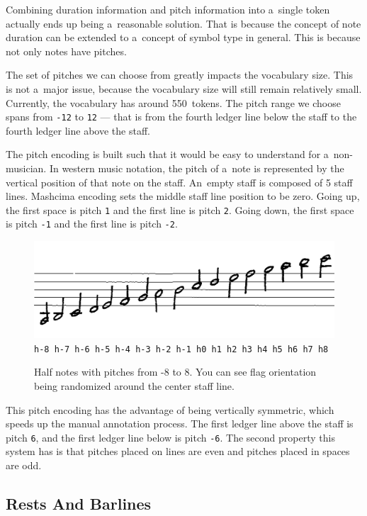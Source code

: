 Combining duration information and pitch information into a~single token actually ends up being a~reasonable solution. That is because the concept of note duration can be extended to a~concept of symbol type in general. This is because not only notes have pitches.

The set of pitches we can choose from greatly impacts the vocabulary size. This is not a~major issue, because the vocabulary size will still remain relatively small. Currently, the vocabulary has around 550~tokens. The pitch range we choose spans from \texttt{-12} to \texttt{12} --- that is from the fourth ledger line below the staff to the fourth ledger line above the staff.

The pitch encoding is built such that it would be easy to understand for a~non-musician. In western music notation, the pitch of a~note is represented by the vertical position of that note on the staff. An~empty staff is composed of 5 staff lines. Mashcima encoding sets the middle staff line position to be zero. Going up, the first space is pitch \texttt{1} and the first line is pitch \texttt{2}. Going down, the first space is pitch \texttt{-1} and the first line is pitch \texttt{-2}.

\begin{figure}[h]
    \centering
    \includegraphics[width=120mm]{../img/rising-half-notes}
    \verb`h-8 h-7 h-6 h-5 h-4 h-3 h-2 h-1 h0 h1 h2 h3 h4 h5 h6 h7 h8`
    \caption{Half notes with pitches from -8 to 8. You can see flag orientation being randomized around the center staff line.}
    \label{fig4:RisingHalfNotes}
\end{figure}

This pitch encoding has the advantage of being vertically symmetric, which speeds up the manual annotation process. The first ledger line above the staff is pitch \texttt{6}, and the first ledger line below is pitch \texttt{-6}. The second property this system has is that pitches placed on lines are even and pitches placed in spaces are odd.


\subsection{Rests And Barlines}

